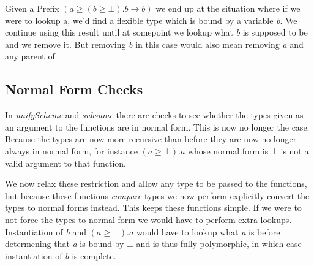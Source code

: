 \documentclass[12pt, a4paper, oneside]{article}
\begin{document}
Given a Prefix $(a \geq (b \geq \bot). b \rightarrow b)$ we end up at the situation where if we were to lookup a, we'd find a flexible type which is bound by a variable \emph{b}. We continue using this result until at somepoint we lookup what \emph{b} is supposed to be and we remove it. But removing \emph{b} in this case would also mean removing \emph{a} and any parent of \
\subsection{Normal Form Checks}
In \textit{unifyScheme} and \textit{subsume} there are checks to see whether the types given as an argument to the functions are in normal form. This is now no longer the case. Because the types are now more recursive than before they are now no longer always in normal form, for instance \emph{$(a \geq \bot).a$} whose normal form is $\bot$ is not a valid argument to that function.

We now relax these restriction and allow any type to be passed to the functions, but because these functions \emph{compare} types we now perform explicitly convert the types to normal forms instead. This keeps these functions simple. If we were to not force the types to normal form we would have to perform extra lookups. Instantiation of \emph{b} and \emph{$(a \geq \bot).a$} would have to lookup what \emph{a} is before determening that \emph{a} is bound by $\bot$ and is thus fully polymorphic, in which case instantiation of \emph{b} is complete.
\end{document}
